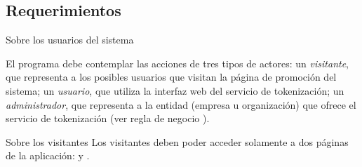 %
%

\subsection{Requerimientos}

{Sobre los usuarios del sistema}
{
  El programa debe contemplar las acciones de tres tipos de actores: un
  \textit{visitante}, que representa a los posibles usuarios que visitan la
  página de promoción del sistema; un \textit{usuario}, que utiliza la interfaz
  web del servicio de tokenización; un \textit{administrador}, que representa a
  la entidad (empresa u organización) que ofrece el servicio de tokenización
  (ver regla de negocio ).

  {Sobre los visitantes}
  {
    Los visitantes deben poder acceder solamente a dos páginas de la aplicación:
     y .
  }
}

